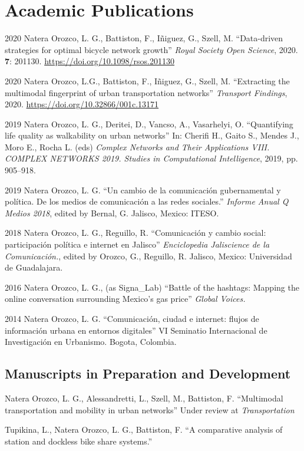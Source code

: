 \documentclass{academiccv}
\begin{document}
\section*{Academic Publications}
\begin{tablist}
	\item[2020] \tab Natera Orozco, L. G., Battiston, F., I\~niguez, G., Szell, M. \enquote{Data-driven strategies for optimal bicycle network growth} \textit{Royal Society Open Science}, 2020. \textbf{7}: 201130. \url{https://doi.org/10.1098/rsos.201130}

	\item[2020] \tab Natera Orozco, L.G., Battiston, F., I\~niguez, G., Szell, M. \enquote{Extracting the multimodal fingerprint of urban transportation networks} \textit{Transport Findings}, 2020. \url{https://doi.org/10.32866/001c.13171}
	\item[2019] \tab Natera Orozco, L. G., Deritei, D., Vancso, A., Vasarhelyi, O. \enquote{Quantifying life quality as walkability on urban networks} In: Cherifi H., Gaito S., Mendes J., Moro E., Rocha L. (eds) \textit{Complex Networks and Their Applications VIII. COMPLEX NETWORKS 2019. Studies in Computational Intelligence}, 2019, pp. 905–918. 
	\item[2019] \tab Natera Orozco, L. G. \enquote{Un cambio de la comunicación gubernamental y política. De los medios de comunicación a las redes sociales.} \textit{Informe Anual Q Medios 2018}, edited by Bernal, G. Jalisco, Mexico: ITESO.
	\item[2018] \tab Natera Orozco, L. G., Reguillo, R. \enquote{Comunicación y cambio social: participación política e internet en Jalisco} \textit{Enciclopedia Jaliscience de la Comunicación.}, edited by Orozco, G., Reguillo, R. Jalisco, Mexico: Universidad de Guadalajara. 
	\item[2016] \tab Natera Orozco, L. G., (as Signa\_Lab) \enquote{Battle of the hashtags: Mapping the online conversation surrounding Mexico's gas price} \textit{Global Voices.} 
	\item[2014] \tab Natera Orozco, L. G. \enquote{Comunicación, ciudad e internet: flujos de información urbana en entornos digitales} VI Seminatio Internacional de Investigación en Urbanismo. Bogota, Colombia. 
\end{tablist}

\subsection*{Manuscripts in Preparation and Development}
\begin{tablist}
	\item[\the\year] \tab Natera Orozco, L. G., Alessandretti, L., Szell, M., Battiston, F. \enquote{Multimodal transportation and mobility in urban networks} Under review at \textit{Transportation}
	\item[\the\year] \tab Tupikina, L., Natera Orozco, L. G., Battiston, F. \enquote{A comparative analysis of station and dockless bike share systems.} 
\end{tablist}
\end{document}
